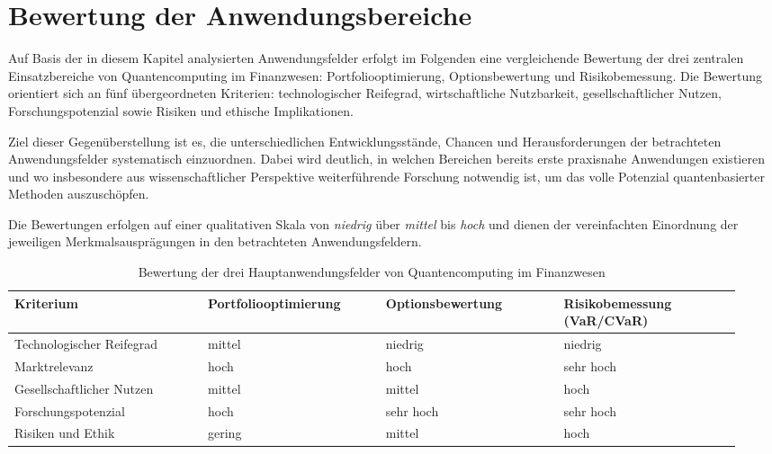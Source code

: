 {\section{Bewertung der Anwendungsbereiche}

Auf Basis der in diesem Kapitel analysierten Anwendungsfelder erfolgt im Folgenden eine vergleichende Bewertung der drei zentralen Einsatzbereiche von Quantencomputing im Finanzwesen: Portfoliooptimierung, Optionsbewertung und Risikobemessung. Die Bewertung orientiert sich an fünf übergeordneten Kriterien: technologischer Reifegrad, wirtschaftliche Nutzbarkeit, gesellschaftlicher Nutzen, Forschungspotenzial sowie Risiken und ethische Implikationen.

Ziel dieser Gegenüberstellung ist es, die unterschiedlichen Entwicklungsstände, Chancen und Herausforderungen der betrachteten Anwendungsfelder systematisch einzuordnen. Dabei wird deutlich, in welchen Bereichen bereits erste praxisnahe Anwendungen existieren und wo insbesondere aus wissenschaftlicher Perspektive weiterführende Forschung notwendig ist, um das volle Potenzial quantenbasierter Methoden auszuschöpfen.

Die Bewertungen erfolgen auf einer qualitativen Skala von \emph{niedrig} über \emph{mittel} bis \emph{hoch} und dienen der vereinfachten Einordnung der jeweiligen Merkmalsausprägungen in den betrachteten Anwendungsfeldern.


\begin{table}[!htbp]
\centering
\renewcommand{\arraystretch}{1.5}
\begin{tabular}{|p{0.25\linewidth}|p{0.23\linewidth}|p{0.23\linewidth}|p{0.23\linewidth}|}
\hline
\textbf{Kriterium} & \textbf{Portfoliooptimierung} & \textbf{Optionsbewertung} & \textbf{Risikobemessung (VaR/CVaR)} \\
\hline
Technologischer Reifegrad & mittel & niedrig & niedrig \\
\hline
Marktrelevanz & hoch & hoch & sehr hoch \\
\hline
Gesellschaftlicher Nutzen & mittel & mittel & hoch \\
\hline
Forschungspotenzial & hoch & sehr hoch & sehr hoch \\
\hline
Risiken und Ethik & gering & mittel & hoch \\
\hline
\end{tabular}
\caption{Bewertung der drei Hauptanwendungsfelder von Quantencomputing im Finanzwesen}
\label{tab:anwendungsbewertung}
\end{table}


}
